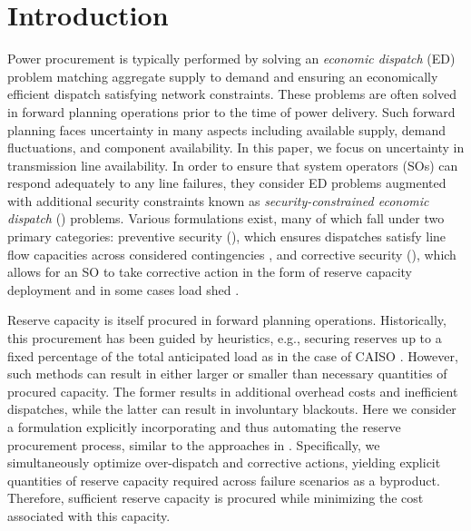 
\section{Introduction}

Power procurement is typically performed by solving an \emph{economic dispatch} (ED) problem matching aggregate supply to demand and ensuring an economically efficient dispatch satisfying network constraints. These problems are often solved in forward planning operations prior to the time of power delivery. Such forward planning faces uncertainty in many aspects including available supply, demand fluctuations, and component availability. In this paper, we focus on uncertainty in transmission line availability. In order to ensure that system operators (SOs) can respond adequately to any line failures, they consider ED problems augmented with additional security constraints known as \emph{security-constrained economic dispatch} (\SCED{}) problems. Various \SCED{} formulations exist, many of which fall under two primary categories: preventive security (\PSCED{}), which ensures dispatches satisfy line flow capacities across considered contingencies \cite{alsac1974optimal}, and corrective security (\CSCED{}), which allows for an SO to take corrective action in the form of reserve capacity deployment \cite{monticelli1987security,capitanescu2007improving,li2016adaptive,capitanescu2011state} and in some cases load shed \cite{bouffard2008stochastic}.

Reserve capacity is itself procured in forward planning operations. Historically, this procurement has been guided by heuristics, e.g., securing reserves up to a fixed percentage of the total anticipated load as in the case of CAISO \cite{CAISO}. However, such methods 
can result in either larger or smaller than necessary quantities of procured capacity. The former results in additional overhead costs and inefficient dispatches, while the latter can result in involuntary blackouts. Here we consider a \SCED{} formulation explicitly incorporating and thus automating the reserve procurement process, 
similar to the approaches in \cite{capitanescu2011state,shi2022scenario,galiana2005scheduling}. Specifically, we simultaneously optimize over-dispatch and corrective actions, yielding explicit quantities of reserve capacity required across failure scenarios as a byproduct. Therefore, sufficient reserve capacity is procured while minimizing the cost associated with this capacity.

